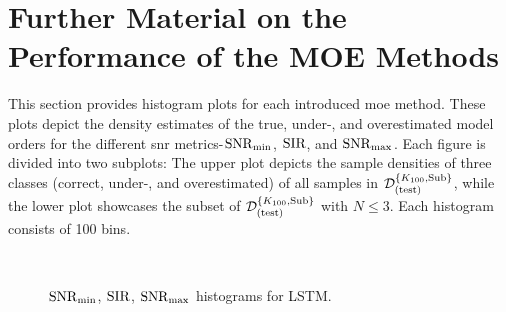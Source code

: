 \section{Further Material on the Performance of the MOE Methods}
\label{app:sec:FurtherMOE}

This section provides histogram plots for each introduced \gls{moe} method. These plots depict the density estimates
of the true, under-, and overestimated model orders for the different \gls{snr} metrics-\( \mathrm{SNR}_{\min} \), \( \mathrm{SIR} \), and \( \mathrm{SNR}_{\max} \).
Each figure is divided into two subplots: The upper plot depicts the sample densities of three classes (correct, under-, and overestimated) of all samples in \( \mathcal{D}^{\{K_{100},\text{Sub}\}}_{(\text{test})} \), while the
lower plot showcases the subset of \( \mathcal{D}^{\{K_{100},\text{Sub}\}}_{(\text{test})} \) with \( N \leq 3 \). Each histogram consists of 100 bins.


\begin{figure}[H]
    \centering
    \\
    \caption{\( \mathrm{SNR}_{\min} \), \( \mathrm{SIR} \), \( \mathrm{SNR}_{\max} \) histograms for LSTM.}
    \label{fig:lstm_pred_hist}
\end{figure}

